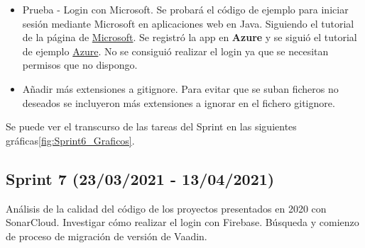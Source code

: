\begin{itemize}
	\item Prueba - Login con Microsoft.
		Se probará el código de ejemplo para iniciar sesión mediante Microsoft en aplicaciones web en Java. Siguiendo el tutorial de la página de \href{https://docs.microsoft.com/en-us/azure/active-directory/develop/quickstart-v2-java-webapp}{Microsoft}. Se registró la app en \textbf{Azure} y se siguió el tutorial de ejemplo \href{https://portal.azure.com/#blade/Microsoft_AAD_RegisteredApps/ApplicationsListBlade/quickStartType/JavaQuickstartPage/sourceType/docs}{Azure}. No se consiguió realizar el login ya que se necesitan permisos que no dispongo.
	\item Añadir más extensiones a gitignore. 
		Para evitar que se suban ficheros no deseados se incluyeron más extensiones a ignorar en el fichero gitignore. 
	
\end{itemize}

Se puede ver el transcurso de las tareas del Sprint en las siguientes gráficas\ref{fig:Sprint6_Graficos}.



\subsection{Sprint 7 (23/03/2021 - 13/04/2021)}
Análisis de la calidad del código de los proyectos presentados en 2020 con SonarCloud. Investigar cómo realizar el login con Firebase. Búsqueda y comienzo de proceso de migración de versión de Vaadin.

